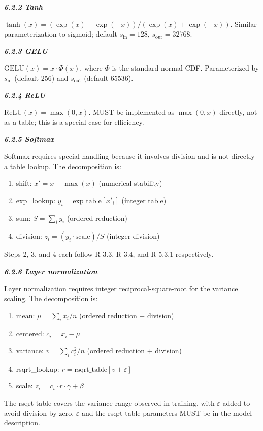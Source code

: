 \documentclass[
]{article}
\begin{document}
\emph{\textbf{6.2.2 Tanh}}

$\tanh(x) = (\exp(x) - \exp(-x)) / (\exp(x) + \exp(-x))$. Similar
parameterization to sigmoid; default $s_{\text{in}} = 128$,
$s_{\text{out}} = 32768$.

\emph{\textbf{6.2.3 GELU}}

$\mathrm{GELU}(x) = x \cdot \Phi(x)$, where $\Phi$ is the standard
normal CDF. Parameterized by $s_{\text{in}}$ (default 256) and
$s_{\text{out}}$ (default 65536).

\emph{\textbf{6.2.4 ReLU}}

$\mathrm{ReLU}(x) = \max(0, x)$. MUST be implemented as
$\max(0, x)$ directly, not as a table; this is a special case for
efficiency.

\emph{\textbf{6.2.5 Softmax}}

Softmax requires special handling because it involves division and
is not directly a table lookup. The decomposition is:
\begin{enumerate}
\item shift: $x' = x - \max(x)$ \quad (numerical stability)
\item exp\_lookup: $y_i = \mathrm{exp\_table}[x'_i]$ \quad (integer table)
\item sum: $S = \sum_i y_i$ \quad (ordered reduction)
\item division: $z_i = (y_i \cdot \mathrm{scale}) / S$ \quad (integer division)
\end{enumerate}
Steps 2, 3, and 4 each follow R-3.3, R-3.4, and R-5.3.1 respectively.

\emph{\textbf{6.2.6 Layer normalization}}

Layer normalization requires integer reciprocal-square-root for the
variance scaling. The decomposition is:
\begin{enumerate}
\item mean: $\mu = \sum_i x_i / n$ \quad (ordered reduction + division)
\item centered: $c_i = x_i - \mu$
\item variance: $v = \sum_i c_i^2 / n$ \quad (ordered reduction + division)
\item rsqrt\_lookup: $r = \mathrm{rsqrt\_table}[v + \varepsilon]$
\item scale: $z_i = c_i \cdot r \cdot \gamma + \beta$
\end{enumerate}
The rsqrt table covers the variance range observed in training, with
$\varepsilon$ added to avoid division by zero. $\varepsilon$ and the
rsqrt table parameters MUST be in the model description.
\end{document}
